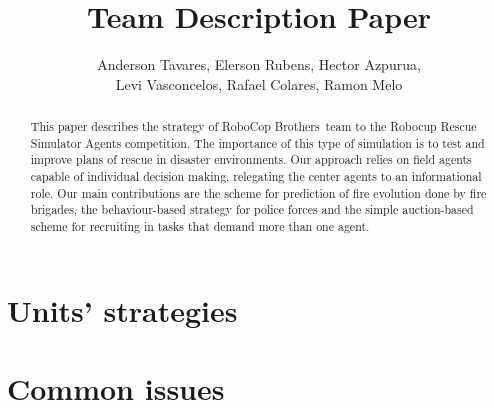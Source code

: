 \documentclass{llncs}
\title{\teamname Team Description Paper}
\author{Anderson Tavares, Elerson Rubens, Hector Azpurua,\\ Levi Vasconcelos, Rafael Colares, Ramon Melo}%
\newcommand{\teamname}{RoboCop Brothers~}
\begin{document}
\maketitle

\begin{abstract}
This paper describes the strategy of \teamname team to the Robocup Rescue Simulator Agents competition. The importance of this type of simulation is to test and improve plans of rescue in disaster environments. Our approach relies on field agents capable of individual decision making, relegating the center agents to an informational role. Our main contributions are the scheme for prediction of fire evolution done by fire brigades, the behaviour-based strategy for police forces and the simple auction-based scheme for recruiting in tasks that demand more than one agent.
\end{abstract}



\section{Units' strategies}
\label{sec:strategies}









\section{Common issues}
\label{sec:common}









\end{document}
